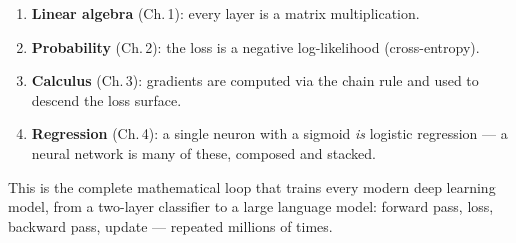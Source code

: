 \begin{enumerate}[leftmargin=*]
  \item \textbf{Linear algebra} (Ch.\,1): every layer is a matrix multiplication.
  \item \textbf{Probability} (Ch.\,2): the loss is a negative log-likelihood (cross-entropy).
  \item \textbf{Calculus} (Ch.\,3): gradients are computed via the chain rule and used to descend the loss surface.
  \item \textbf{Regression} (Ch.\,4): a single neuron with a sigmoid \emph{is} logistic regression — a neural network is many of these, composed and stacked.
\end{enumerate}

This is the complete mathematical loop that trains every modern deep
learning model, from a two-layer classifier to a large language model:
forward pass, loss, backward pass, update — repeated millions of times.
